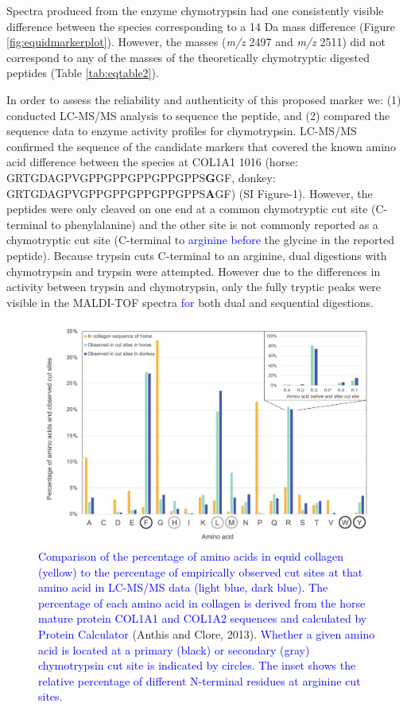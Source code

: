 \documentclass[preprint, 3p, authoryear]{elsarticle} %
\begin{document}
Spectra produced from the enzyme chymotrypsin had one consistently visible difference between the species corresponding to a 14 Da mass difference (Figure \ref{fig:equidmarkerplot}). However, the masses (\emph{m/z} 2497 and \emph{m/z} 2511) did not correspond to any of the masses of the theoretically chymotryptic digested peptides (Table \ref{tab:eqtable2}).

In order to assess the reliability and authenticity of this proposed marker we: (1) conducted LC-MS/MS analysis to sequence the peptide, and (2) compared the sequence data to enzyme activity profiles for chymotrypsin. LC-MS/MS confirmed the sequence of the candidate markers that covered the known amino acid difference between the species at COL1A1 1016 (horse: GRTGDAGPVGPPGPPGPPGPPGPPS\textbf{G}GF, donkey: GRTGDAGPVGPPGPPGPPGPPGPPS\textbf{A}GF) (SI Figure-1). However, the peptides were only cleaved on one end at a common chymotryptic cut site (C-terminal to phenylalanine) and the other site is not commonly reported as a chymotryptic cut site (C-terminal to \textcolor{blue}{arginine before} the glycine in the reported peptide). Because trypsin cuts C-terminal to an arginine, dual digestions with chymotrypsin and trypsin were attempted. However due to the differences in activity between trypsin and chymotrypsin, only the fully tryptic peaks were visible in the MALDI-TOF spectra \textcolor{blue}{for} both dual and sequential digestions.



\begin{figure}
\includegraphics[width=1\linewidth]{../img/chymocutsite} \caption{\textcolor{blue}{Comparison of the percentage of amino acids in equid collagen (yellow) to the percentage of empirically observed cut sites at that amino acid in LC-MS/MS data (light blue, dark blue). The percentage of each amino acid in collagen is derived from the horse mature protein COL1A1 and COL1A2 sequences and calculated by Protein Calculator} (Anthis and Clore, 2013). \textcolor{blue}{Whether a given amino acid is located at a primary (black) or secondary (gray) chymotrypsin cut site is indicated by circles. The inset shows the relative percentage of different N-terminal residues at arginine cut sites. }}\label{fig:chymocutplot}
\end{figure}
\end{document}
